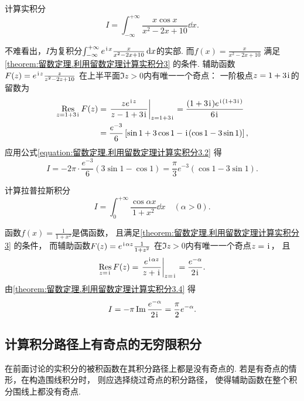 \begin{example}
计算实积分\begin{equation*}
	I = \int_{-\infty}^{+\infty} \frac{x \cos x}{x^2-2x+10} \dd{x}.
\end{equation*}
\begin{solution}
不难看出，\(I\)为复积分\(\int_{-\infty}^{+\infty} e^{\kern1pt\mathrm{i}\kern1pt x} \frac{x}{x^2-2x+10} \dd{x}\)的实部.
而\(f(x) = \frac{x}{x^2-2x+10}\)
满足\cref{theorem:留数定理.利用留数定理计算实积分3} 的条件.
辅助函数\(F(z) = e^{\kern1pt\mathrm{i}\kern1pt z} \frac{z}{z^2-2z+10}\)
在上半平面\(\Im z > 0\)内有唯一一个奇点：
一阶极点\(z=1+3\kern1pt\mathrm{i}\kern1pt\)的留数为\begin{align*}
	\Res_{z=1+3\iu} F(z)
	&= \eval{\frac{z e^{\iu z}}{z-1+3\iu}}_{z=1+3\iu}
		= \frac{(1+3\iu) e^{\iu(1+3\iu)}}{6\iu} \\
	&= \frac{e^{-3}}{6} \left[ \sin1+3\cos1-\iu(\cos1-3\sin1)\right],
\end{align*}
应用公式\cref{equation:留数定理.利用留数定理计算实积分3.2} 得\begin{equation*}
	I = -2\pi \cdot \frac{e^{-3}}{6} (3\sin1-\cos1)
	= \frac{\pi}{3} e^{-3} (\cos1-3\sin1).
\end{equation*}
\end{solution}
\end{example}

\begin{example}
计算拉普拉斯积分\begin{equation*}
	I = \int_0^{+\infty} \frac{\cos \alpha x}{1+x^2} \dd{x} \quad(\alpha>0).
\end{equation*}
\begin{solution}
函数\(f(x) = \frac{1}{1+x^2}\)是偶函数，
且满足\cref{theorem:留数定理.利用留数定理计算实积分3} 的条件，
而辅助函数\(F(z) = e^{\kern1pt\mathrm{i}\kern1pt\alpha z} \frac{1}{1+z^2}\)
在\(\Im z > 0\)内有唯一一个奇点\(z=\kern1pt\mathrm{i}\kern1pt\)，
且\begin{equation*}
	\Res_{z=\iu} F(z) = \eval{\frac{e^{\iu\alpha z}}{z+\iu}}_{z=\iu}
	= \frac{e^{-\alpha}}{2\iu}.
\end{equation*}
由\cref{theorem:留数定理.利用留数定理计算实积分3.4} 得\begin{equation*}
	I = -\pi \Im \frac{e^{-\alpha}}{2\kern1pt\mathrm{i}\kern1pt}
	= \frac{\pi}{2} e^{-\alpha}.
\end{equation*}
\end{solution}
\end{example}

\subsection{计算积分路径上有奇点的无穷限积分}
在前面讨论的实积分的被积函数在其积分路径上都是没有奇点的.
若是有奇点的情形，在构造围线积分时，
则应选择绕过奇点的积分路径，
使得辅助函数在整个积分围线上都没有奇点.

